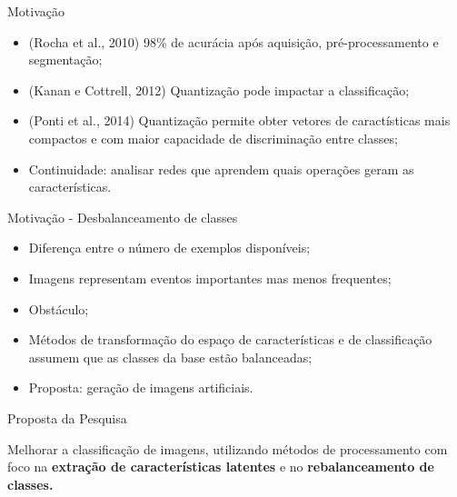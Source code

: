 \documentclass{beamer}
\begin{document}
\begin{frame}{Motivação}
\setlength\leftmargini{0em}
\justifying
  \begin{itemize}
\justifying
    \item (Rocha et al., 2010) 98\% de acurácia após aquisição, pré-processamento e segmentação; %
    \item (Kanan e Cottrell, 2012) Quantização pode impactar a classificação;
    \item (Ponti et al., 2014) Quantização permite obter vetores de caractísticas mais compactos e com maior capacidade de discriminação entre classes;
    \item[]  {Continuidade: analisar redes que aprendem quais operações geram as características.}
  \end{itemize}
\end{frame}
\begin{frame}{Motivação - Desbalanceamento de classes}
\setlength\leftmargini{0em}
\justifying
{}
  \begin{itemize}
    \item Diferença entre o número de exemplos disponíveis;
    \item Imagens representam eventos importantes mas menos frequentes;
    \item Obstáculo;
    \item Métodos de transformação do espaço de características e de 
    classificação assumem que as classes da base estão balanceadas;
    \item Proposta: geração de imagens artificiais. %
  \end{itemize}
\end{frame}
\begin{frame}{Proposta da Pesquisa}
\begin{block}{}
\justifying
    Melhorar a classificação de imagens, utilizando métodos de processamento com foco na \textbf{extração de características latentes} e no \textbf{rebalanceamento de classes.}
\end{block}
\end{frame}
\end{document}
